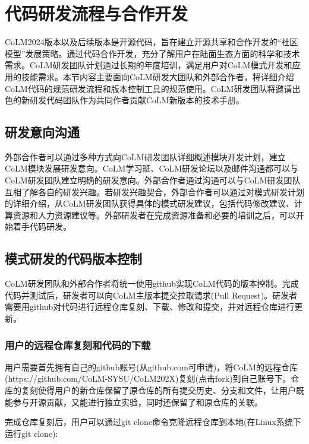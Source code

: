 \documentclass[a4paper,12pt,twoside]{article}
\begin{document}
\section{代码研发流程与合作开发}

CoLM2024版本以及后续版本是开源代码，旨在建立开源共享和合作开发的“社区模型”发展策略。通过代码合作开发，充分了解用户在陆面生态方面的科学和技术需求。CoLM研发团队计划通过长期的年度培训，满足用户对CoLM模式开发和应用的技能需求。本节内容主要面向CoLM研发大团队和外部合作者，将详细介绍CoLM代码的规范研发流程和版本控制工具的规范使用。CoLM研发团队将邀请出色的新研发代码团队作为共同作者贡献CoLM新版本的技术手册。

\subsection{研发意向沟通}
外部合作者可以通过多种方式向CoLM研发团队详细概述模块开发计划，建立CoLM模块发展研发意向。CoLM学习班、CoLM研发论坛以及邮件沟通都可以与CoLM研发团队建立明确的研发意向。外部合作者通过沟通可以与CoLM研发团队互相了解各自的研发兴趣。若研发兴趣契合，外部合作者可以通过对模式研发计划的详细介绍，从CoLM研发团队获得具体的模式研发建议，包括代码修改建议、计算资源和人力资源建议等。外部研发者在完成资源准备和必要的培训之后，可以开始着手代码研发。

\subsection{模式研发的代码版本控制}
CoLM研发团队和外部合作者将统一使用github实现CoLM代码的版本控制。完成代码并测试后，研发者可以向CoLM主版本提交拉取请求(Pull Request)。研发者需要用github对代码进行远程仓库复刻、下载、修改和提交，并对远程仓库进行更新。

\subsubsection{用户的远程仓库复刻和代码的下载}
用户需要首先拥有自己的github账号(从github.com可申请)，将CoLM的远程仓库(https://github.com/CoLM-SYSU/CoLM202X)复刻(点击fork)到自己账号下。仓库的复刻使得用户的新仓库保留了原仓库的所有提交历史、分支和文件，让用户既能参与开源贡献，又能进行独立实验，同时还保留了和原仓库的关联。

完成仓库复刻后，用户可以通过git clone命令克隆远程仓库到本地(在Linux系统下运行git clone):
\end{document}
